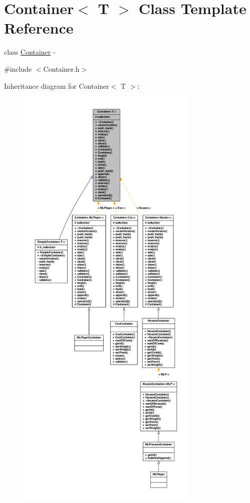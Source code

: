 \hypertarget{class_container}{
\section{Container$<$ T $>$ Class Template Reference}
\label{class_container}
}


class \hyperlink{class_container}{Container} -\/  




{\ttfamily \#include $<$Container.h$>$}



Inheritance diagram for Container$<$ T $>$:
\nopagebreak
\begin{figure}[H]
\begin{center}
\leavevmode
\includegraphics[height=600pt]{class_container__inherit__graph}
\end{center}
\end{figure}


